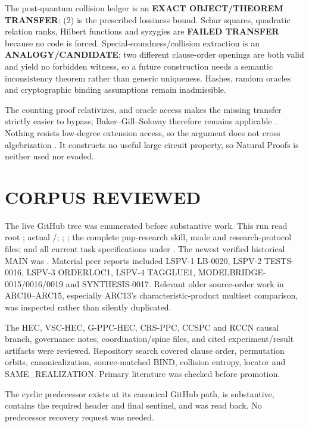 \documentclass[11pt]{article}
\begin{document}
The post-quantum collision ledger is an \textbf{EXACT OBJECT/THEOREM
TRANSFER}: (2) is the prescribed lossiness bound.  Schur squares, quadratic
relation ranks, Hilbert functions and syzygies are \textbf{FAILED TRANSFER}
because no code is forced.  Special-soundness/collision extraction is an
\textbf{ANALOGY/CANDIDATE}: two different clause-order openings are both
valid and yield no forbidden witness, so a future construction needs a
semantic inconsistency theorem rather than generic uniqueness.  Hashes,
random oracles and cryptographic binding assumptions remain inadmissible.

The counting proof relativizes, and oracle access makes the missing transfer
strictly easier to bypass; Baker--Gill--Solovay therefore remains applicable
\cite{BGS75}.  Nothing resists low-degree extension access, so the argument
does not cross algebrization \cite{AW09}.  It constructs no useful large
circuit property, so Natural Proofs is neither used nor evaded.

\section{CORPUS REVIEWED}

The live GitHub tree was enumerated before substantive work.  This run read
root ; actual /;
; ; the complete pnp-research skill, mode and
research-protocol files; and all current task specifications under
.  The newest verified historical MAIN was
.  Material peer
reports included LSPV-1 LB-0020, LSPV-2 TESTS-0016, LSPV-3 ORDERLOC1, LSPV-4
TAGGLUE1, MODELBRIDGE-0015/0016/0019 and SYNTHESIS-0017.  Relevant older
source-order work in ARC10--ARC15, especially ARC13's characteristic-product
multiset comparison, was inspected rather than silently duplicated.

The HEC, VSC-HEC, G-PPC-HEC, CRS-PPC, CCSPC and RCCN causal branch, governance
notes, coordination/spine files, and cited experiment/result artifacts were
reviewed.  Repository search covered clause order, permutation orbits,
canonicalization, source-matched BIND, collision entropy, locator and
SAME\_REALIZATION.  Primary literature \cite{MRRR12,FLMV05,BGS75,AW09} was
checked before promotion.

The cyclic predecessor
 exists at
its canonical GitHub path, is substantive, contains the required header and
final sentinel, and was read back.  No predecessor recovery request was
needed.
\end{document}

